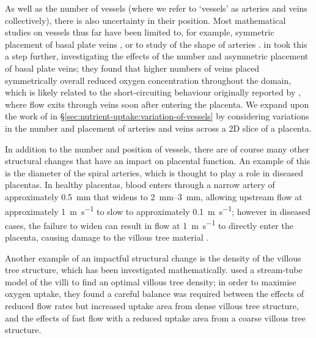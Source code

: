     As well as the number of vessels (where we refer to `vessels' as arteries and veins collectively), there is also uncertainty in their position. Most mathematical studies on vessels thus far have been limited to, for example, symmetric placement of basal plate veins \cite{chernyavskyMathematicalModelIntervillous2010}, or to study of the shape of arteries \cite{burtonRheologicalPhysiologicalConsequences2009,rothDynamicModelingUteroplacental2017}. \citeauthor{meklerImpactTissuePorosity2022} \cite{meklerImpactTissuePorosity2022} in \citeyear{meklerImpactTissuePorosity2022} took this a step further, investigating the effects of the number and asymmetric placement of basal plate veins; they found that higher numbers of veins placed symmetrically overall reduced oxygen concentration throughout the domain, which is likely related to the short-circuiting behaviour originally reported by \citeauthor{chernyavskyMathematicalModelIntervillous2010} \cite{chernyavskyMathematicalModelIntervillous2010}, where flow exits through veins soon after entering the placenta. We expand upon the work of \citeauthor{meklerImpactTissuePorosity2022} \cite{meklerImpactTissuePorosity2022} in \S\ref{sec:nutrient-uptake:variation-of-vessels} by considering variations in the number and placement of arteries and veins across a 2D slice of a placenta.

    In addition to the number and position of vessels, there are of course many other structural changes that have an impact on placental function. An example of this is the diameter of the spiral arteries, which is thought to play a role in diseased placentas. In healthy placentas, blood enters through a narrow artery of approximately \qty{0.5}{\milli\metre} that widens to \qtyrange{2}{3}{\milli\metre}, allowing upstream flow at approximately \qty{1}{\metre\per\second} to slow to approximately \qty{0.1}{\metre\per\second}; however in diseased cases, the failure to widen can result in flow at \qty{1}{\metre\per\second} to directly enter the placenta, causing damage to the villous tree material \cite{burtonRheologicalPhysiologicalConsequences2009}. 

    Another example of an impactful structural change is the density of the villous tree structure, which has been investigated mathematically. \citeauthor{serovOptimalVilliDensity2015} \cite{serovOptimalVilliDensity2015} used a stream-tube model of the villi to find an optimal villous tree density; in order to maximise oxygen uptake, they found a careful balance was required between the effects of reduced flow rates but increased uptake area from dense villous tree structure, and the effects of fast flow with a reduced uptake area from a coarse villous tree structure.

